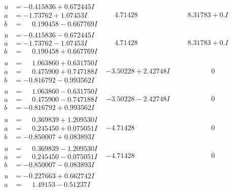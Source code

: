 \documentclass[1p]{elsarticle_modified}
\theoremstyle{definition}
\begin{document}
$$\begin{array}{c|c|c}
\begin{aligned}
u &= -0.415836 + 0.672445 I \\
a &= -1.73762 + 1.07453 I \\
b &= \phantom{-}0.190458 - 0.667769 I\end{aligned}
 & \phantom{-}4.71428\phantom{ +0.000000I} & \phantom{-}8.31783 + 0. I\phantom{ +0.000000I} \\ \hline\begin{aligned}
u &= -0.415836 - 0.672445 I \\
a &= -1.73762 - 1.07453 I \\
b &= \phantom{-}0.190458 + 0.667769 I\end{aligned}
 & \phantom{-}4.71428\phantom{ +0.000000I} & \phantom{-}8.31783 + 0. I\phantom{ +0.000000I} \\ \hline\begin{aligned}
u &= \phantom{-}1.063860 + 0.631750 I \\
a &= \phantom{-}0.475900 + 0.747188 I \\
b &= -0.816792 - 0.993562 I\end{aligned}
 & -3.50228 + 2.42748 I & \phantom{-0.000000 } 0 \\ \hline\begin{aligned}
u &= \phantom{-}1.063860 - 0.631750 I \\
a &= \phantom{-}0.475900 - 0.747188 I \\
b &= -0.816792 + 0.993562 I\end{aligned}
 & -3.50228 - 2.42748 I & \phantom{-0.000000 } 0 \\ \hline\begin{aligned}
u &= \phantom{-}0.369839 + 1.209530 I \\
a &= \phantom{-}0.245450 + 0.075051 I \\
b &= -0.850007 + 0.083893 I\end{aligned}
 & -4.71428\phantom{ +0.000000I} & \phantom{-0.000000 } 0 \\ \hline\begin{aligned}
u &= \phantom{-}0.369839 - 1.209530 I \\
a &= \phantom{-}0.245450 - 0.075051 I \\
b &= -0.850007 - 0.083893 I\end{aligned}
 & -4.71428\phantom{ +0.000000I} & \phantom{-0.000000 } 0 \\ \hline\begin{aligned}
u &= -0.227663 + 0.662742 I \\
a &= \phantom{-}1.49153 - 0.51237 I \\

\end{aligned}
\end{array}$$
\end{document}
